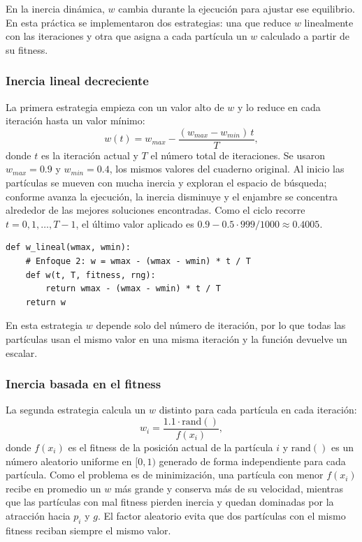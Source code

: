  En la inercia dinámica, $w$ cambia durante la ejecución para ajustar ese equilibrio. En esta práctica se implementaron dos estrategias: una que reduce $w$ linealmente con las iteraciones y otra que asigna a cada partícula un $w$ calculado a partir de su fitness.



\subsubsection{Inercia lineal decreciente}

La primera estrategia empieza con un valor alto de $w$ y lo reduce en cada iteración hasta un valor mínimo:
\begin{equation}
w(t) = w_{max} - \frac{(w_{max} - w_{min})\,t}{T},
\label{eq:w_lineal}
\end{equation}
donde $t$ es la iteración actual y $T$ el número total de iteraciones. Se usaron $w_{max} = 0.9$ y $w_{min} = 0.4$, los mismos valores del cuaderno original. Al inicio las partículas se mueven con mucha inercia y exploran el espacio de búsqueda; conforme avanza la ejecución, la inercia disminuye y el enjambre se concentra alrededor de las mejores soluciones encontradas. Como el ciclo recorre $t = 0, 1, \dots, T-1$, el último valor aplicado es $0.9 - 0.5 \cdot 999/1000 \approx 0.4005$.

\begin{lstlisting}[emph={w_lineal, w}, caption={Estrategia de $w$ lineal decreciente}]
def w_lineal(wmax, wmin):
    # Enfoque 2: w = wmax - (wmax - wmin) * t / T
    def w(t, T, fitness, rng):
        return wmax - (wmax - wmin) * t / T
    return w
\end{lstlisting}

En esta estrategia $w$ depende solo del número de iteración, por lo que todas las partículas usan el mismo valor en una misma iteración y la función devuelve un escalar.

\subsubsection{Inercia basada en el fitness}

La segunda estrategia calcula un $w$ distinto para cada partícula en cada iteración:
\begin{equation}
w_i = \frac{1.1 \cdot \text{rand}()}{f(x_i)},
\label{eq:w_fitness}
\end{equation}
donde $f(x_i)$ es el fitness de la posición actual de la partícula $i$ y $\text{rand}()$ es un número aleatorio uniforme en $[0, 1)$ generado de forma independiente para cada partícula. Como el problema es de minimización, una partícula con menor $f(x_i)$ recibe en promedio un $w$ más grande y conserva más de su velocidad, mientras que las partículas con mal fitness pierden inercia y quedan dominadas por la atracción hacia $p_i$ y $g$. El factor aleatorio evita que dos partículas con el mismo fitness reciban siempre el mismo valor.


